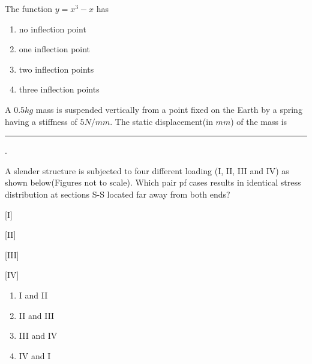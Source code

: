 \item The function $y=x^3-x$ has
\begin{enumerate}
\item no inflection point
\item one inflection point
\item two inflection points
\item three inflection points
\end{enumerate}
\item A $0.5 kg$ mass is suspended vertically from a point fixed on the Earth by a spring having a stiffness of $5 N/mm$. The static displacement(in $mm$) of the mass is \rule{2.5cm}{0.4pt}.

\item A slender structure is subjected to four different loading (I, II, III and IV) as shown below(Figures not to scale). Which pair pf cases results in identical stress distribution at sections S-S located far away from both ends?

[I]




[II]




[III]


 


[IV]


 

\begin{enumerate}
\item I and II
\item II and III
\item III and IV
\item IV and I
\end{enumerate}

